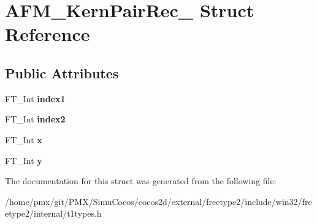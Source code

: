 \hypertarget{structAFM__KernPairRec__}{}\section{A\+F\+M\+\_\+\+Kern\+Pair\+Rec\+\_\+ Struct Reference}
\label{structAFM__KernPairRec__}
\subsection*{Public Attributes}
\begin{DoxyCompactItemize}
\item 
\mbox{\label{structAFM__KernPairRec___a732bca56dd4a070b1d887ada1637e810}} 
F\+T\+\_\+\+Int {\bfseries index1}
\item 
\mbox{\label{structAFM__KernPairRec___aee548123779323c255180112c7f5b831}} 
F\+T\+\_\+\+Int {\bfseries index2}
\item 
\mbox{\label{structAFM__KernPairRec___a4b7f90a0e17ed89353fec14ddb29fa12}} 
F\+T\+\_\+\+Int {\bfseries x}
\item 
\mbox{\label{structAFM__KernPairRec___aa177aa612e79701261eba72c76ea3f08}} 
F\+T\+\_\+\+Int {\bfseries y}
\end{DoxyCompactItemize}


The documentation for this struct was generated from the following file\+:\begin{DoxyCompactItemize}
\item 
/home/pmx/git/\+P\+M\+X/\+Simu\+Cocos/cocos2d/external/freetype2/include/win32/freetype2/internal/t1types.\+h\end{DoxyCompactItemize}
